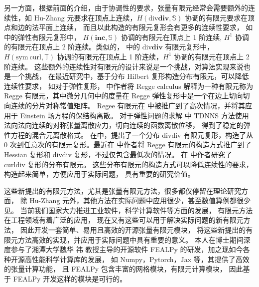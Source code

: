 \documentclass[lang=cn,a4paper,newtx]{elegantpaper}
\begin{document}
另一方面，根据前面的介绍，由于协调性的要求，张量有限元经常会需要额外的连续性，如
Hu-Zhang 元要求在顶点上连续，$H(\mathrm{div}\mathbf{div}, \mathbb{S})$
协调的有限元要求在顶点和边的法平面上连续，
而且以此构造的有限元复形会有更多的连续性要求，
如 \cite{chenhuang2022finitemc} 中的弹性有限元复形中，
$H(\mathbf{inc}, \mathbb{S})$ 协调的有限元在顶点上 1
阶连续, $H^1$ 协调的有限元在顶点上 2 阶连续。类似的，
\cite{huliangma2022conforming} 中的 $\mathrm{div}\mathbf{div}$
有限元复形中，$H(\mathrm{sym\ curl}, \mathbb{T})$ 协调的有限元在顶点上
1 阶连续，$H^1$ 协调的有限元在顶点上 2 阶连续。
这些额外的连续性对有限元的设计来说是一个挑战，对算法实现来说也是一个挑战，
在最近研究中，基于分布 Hilbert
复形构造分布有限元，可以降低连续性要求，
如对于弹性复形，\cite{christiansen2011linearization}
中作者将 Regge calculus 解释为一种有限元称为 Regge 
有限元，其中微分几何中的度量在 Regge
弹性复形中是一个在边上切向切向连续的分片对称常值矩阵。
Regee 有限元在 \cite{li2018regge} 中被推广到了高次情况，并将其应用于 Einstein 场方程的保结构离散。
对于弹性问题的求解 \cite{pechstein2011tangential, pechstein2018analysis}中 TDNNS
方法使用法向法向连续的对称张量离散应力，切向连续的函数离散位移，
得到了稳定的弹性方程的混合元离散格式。
在\cite{chen2024new}中，提出了一个分布 divdiv 有限元复形，构造了从 0
次到任意次的有限元复形。最近在 \cite{hu2023distributional} 中作者将 Regge
有限元的构造方式推广到了 Hessian 复形和 divdiv 复形，不过仅包含最低次的情况。
在 \cite{chenhuang2023distributional} 中作者研究了 $\mathrm{curl div}$ 复形的分布有限元。
这些分布有限元的构造方式可以降低连续性的要求，构造起来简单，方便应用于实际问题，
具有重要的研究价值。

这些新提出的有限元方法，尤其是张量有限元方法，很多都仅停留在理论研究方面，
除 Hu-Zhang 元外，其他方法在实际问题中应用很少，甚至数值算例都很少见。
当前我们国家大力推进工业软件，科学计算软件等方面的发展，
有限元方法在工程领域有着广泛的应用，
现在又有这些可以用于解决实际问题的新有限元方法，
因此开发一套简单、易用且高效的开源张量有限元模块，
将这些新提出的有限元方法高效的实现，并应用于实际问题中具有重要的意义。
本人在博士期间深度参与了湘潭大学魏华
{ 祎}
教授主导的开源软件 FEALPy 
的研发，加之现如今各种开源高性能科学计算库的发展，
如 Numpy，Pytorch，Jax 等，其提供了高效的张量计算功能，
且 FEALPy 包含丰富的网格模块，有限元计算模块，
因此基于 FEALPy 开发这样的模块是可行的。
\end{document}
